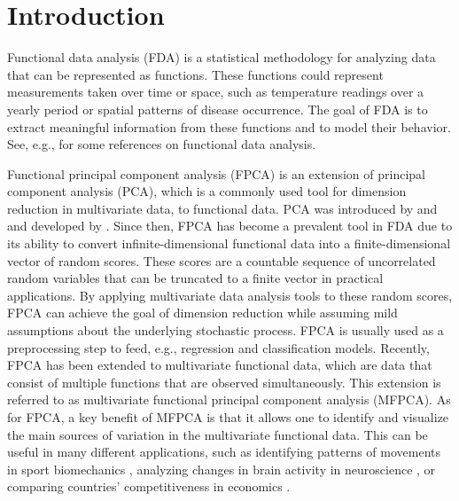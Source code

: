 \section{Introduction} %
\label{sec:introduction}

Functional data analysis (FDA) is a statistical methodology for analyzing data that can be represented as functions. These functions could represent measurements taken over time or space, such as temperature readings over a yearly period or spatial patterns of disease occurrence. The goal of FDA is to extract meaningful information from these functions and to model their behavior. See, e.g., \cite{ramsayFunctionalDataAnalysis2005,horvathInferenceFunctionalData2012,wangFunctionalDataAnalysis2016,kokoszkaSpecialIssueFunctional2017} for some references on functional data analysis.

Functional principal component analysis (FPCA) is an extension of principal component analysis (PCA), which is a commonly used tool for dimension reduction in multivariate data, to functional data. PCA was introduced by \cite{karhunenUeberLineareMethoden1947} and \cite{loeveFonctionsAleatoiresStationnaires1945} and developed by \cite{dauxoisAsymptoticTheoryPrincipal1982}. Since then, FPCA has become a prevalent tool in FDA due to its ability to convert infinite-dimensional functional data into a finite-dimensional vector of random scores. These scores are a countable sequence of uncorrelated random variables that can be truncated to a finite vector in practical applications. By applying multivariate data analysis tools to these random scores, FPCA can achieve the goal of dimension reduction while assuming mild assumptions about the underlying stochastic process. FPCA is usually used as a preprocessing step to feed, e.g., regression and classification models. Recently, FPCA has been extended to multivariate functional data, which are data that consist of multiple functions that are observed simultaneously. This extension is referred to as multivariate functional principal component analysis (MFPCA). As for FPCA, a key benefit of MFPCA is that it allows one to identify and visualize the main sources of variation in the multivariate functional data. This can be useful in many different applications, such as identifying patterns of movements in sport biomechanics \citep{warmenhovenBivariateFunctionalPrincipal2019}, analyzing changes in brain activity in neuroscience \citep{songSparseMultivariateFunctional2022}, or comparing  countries' competitiveness in economics \citep{krzyskoMultidimensionalEconomicIndicators2022}.


